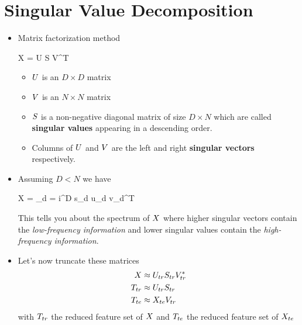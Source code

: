 \section{Singular Value Decomposition}
\begin{itemize}
	\item Matrix factorization method
	\begin{myalign*}
	    \*X = \*U \*S \*V^T
	\end{myalign*}
	\begin{itemize}
		\item $\*U$ is an $D \times D$ matrix
		\item $\*V$ is an $N \times N$ matrix
		\item $\*S$ is a non-negative diagonal matrix of size $D \times N$ which are called \textbf{singular values} appearing in a descending order.
		\item Columns of $\*U$ and $\*V$ are the left and right \textbf{singular vectors} respectively.
	\end{itemize}
	\item Assuming $D < N$ we have
	\begin{myalign*}
	    \*X = \sum_{d = i}^D s_d \*u_d \*v_d^T
	\end{myalign*}
	This tells you about the spectrum of $\*X$ where higher singular vectors contain the \textit{low-frequency information} and lower singular values contain the \textit{high-frequency information}.
    \item Let's now truncate these matrices
    \begin{align*}
        \*X &\approx \*U_{tr} \*S_{tr} \*V^*_{tr} \\
        \*T_{tr} &\approx \*U_{tr} \*S_{tr} \\
        \*T_{te} &\approx \*X_{te}\*V_{tr}
    \end{align*}
    with $\*T_{tr}$ the reduced feature set of $\*X$ and $\*T_{te}$ the reduced feature set of $\*X_{te}$
\end{itemize}

